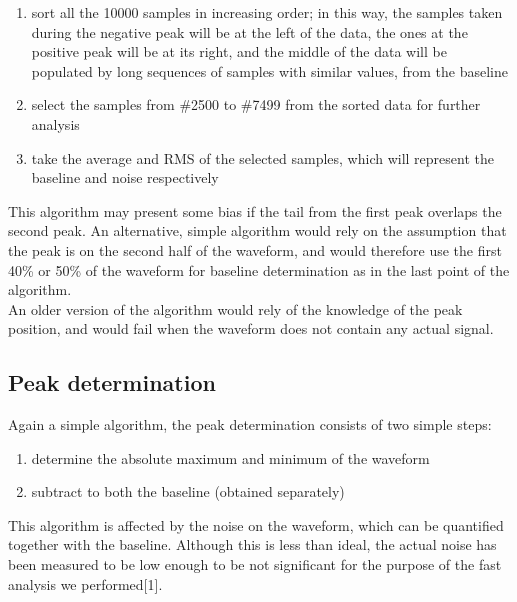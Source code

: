 \begin{enumerate}
\tightlist
\item
  sort all the 10000 samples in increasing order; in this way, the
  samples taken during the negative peak will be at the left of the
  data, the ones at the positive peak will be at its right, and the
  middle of the data will be populated by long sequences of samples with
  similar values, from the baseline
\item
  select the samples from \#2500 to \#7499 from the sorted data for
  further analysis
\item
  take the average and RMS of the selected samples, which will represent
  the baseline and noise respectively
\end{enumerate}

This algorithm may present some bias if the tail from the first peak
overlaps the second peak. An alternative, simple algorithm would rely on
the assumption that the peak is on the second half of the waveform, and
would therefore use the first 40\% or 50\% of the waveform for baseline
determination as in the last point of the algorithm.\\

An older version of the algorithm would rely of the knowledge of the
peak position, and would fail when the waveform does not contain any
actual signal.


\subsection{Peak determination}
\label{sec:peak-determination}


Again a simple algorithm, the peak determination consists of two simple
steps:

\begin{enumerate}
\tightlist
\item
  determine the absolute maximum and minimum of the waveform
\item
  subtract to both the baseline (obtained separately)
\end{enumerate}

This algorithm is affected by the noise on the waveform, which can be
quantified together with the baseline. Although this is less than ideal,
the actual noise has been measured to be low enough to be not
significant for the purpose of the fast analysis we performed{[}1{]}.\\


